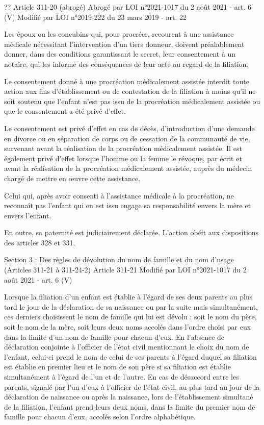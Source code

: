 \documentclass[
  12pt,
]{book}
\begin{document}
\begin{encadre}{??}
Article 311-20 (abrogé)
Abrogé par LOI n°2021-1017 du 2 août 2021 - art. 6 (V)
Modifié par LOI n°2019-222 du 23 mars 2019 - art. 22

Les époux ou les concubins qui, pour procréer, recourent à une assistance médicale nécessitant l'intervention d'un tiers donneur, doivent préalablement donner, dans des conditions garantissant le secret, leur consentement à un notaire, qui les informe des conséquences de leur acte au regard de la filiation.

Le consentement donné à une procréation médicalement assistée interdit toute action aux fins d'établissement ou de contestation de la filiation à moins qu'il ne soit soutenu que l'enfant n'est pas issu de la procréation médicalement assistée ou que le consentement a été privé d'effet.

Le consentement est privé d'effet en cas de décès, d'introduction d'une demande en divorce ou en séparation de corps ou de cessation de la communauté de vie, survenant avant la réalisation de la procréation médicalement assistée. Il est également privé d'effet lorsque l'homme ou la femme le révoque, par écrit et avant la réalisation de la procréation médicalement assistée, auprès du médecin chargé de mettre en œuvre cette assistance.

Celui qui, après avoir consenti à l'assistance médicale à la procréation, ne reconnaît pas l'enfant qui en est issu engage sa responsabilité envers la mère et envers l'enfant.

En outre, sa paternité est judiciairement déclarée. L'action obéit aux dispositions des articles 328 et 331.

Section 3 : Des règles de dévolution du nom de famille et du nom d'usage (Articles 311-21 à 311-24-2)
Article 311-21
Modifié par LOI n°2021-1017 du 2 août 2021 - art. 6 (V)

Lorsque la filiation d'un enfant est établie à l'égard de ses deux parents au plus tard le jour de la déclaration de sa naissance ou par la suite mais simultanément, ces derniers choisissent le nom de famille qui lui est dévolu : soit le nom du père, soit le nom de la mère, soit leurs deux noms accolés dans l'ordre choisi par eux dans la limite d'un nom de famille pour chacun d'eux. En l'absence de déclaration conjointe à l'officier de l'état civil mentionnant le choix du nom de l'enfant, celui-ci prend le nom de celui de ses parents à l'égard duquel sa filiation est établie en premier lieu et le nom de son père si sa filiation est établie simultanément à l'égard de l'un et de l'autre. En cas de désaccord entre les parents, signalé par l'un d'eux à l'officier de l'état civil, au plus tard au jour de la déclaration de naissance ou après la naissance, lors de l'établissement simultané de la filiation, l'enfant prend leurs deux noms, dans la limite du premier nom de famille pour chacun d'eux, accolés selon l'ordre alphabétique.


\end{encadre}
\end{document}
